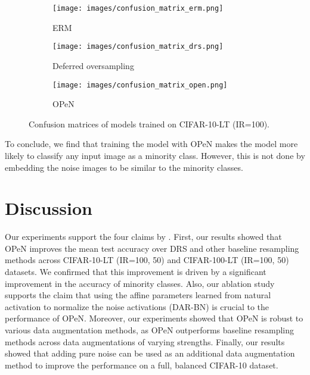 \begin{figure}[!ht]
    \centering
    \begin{subfigure}[b]{0.3\textwidth}
        \centering
        \texttt{[image: images/confusion\_matrix\_erm.png]}
        \caption{ERM}
        \label{fig:cmatrix_erm}
    \end{subfigure}
    \hfill
    \begin{subfigure}[b]{0.3\textwidth}
        \centering
        \texttt{[image: images/confusion\_matrix\_drs.png]}
        \caption{Deferred oversampling}
        \label{fig:cmatrix_drs}
    \end{subfigure}
    \hfill
    \begin{subfigure}[b]{0.3\textwidth}
        \centering
        \texttt{[image: images/confusion\_matrix\_open.png]}
        \caption{OPeN}
        \label{fig:cmatrix_open}
    \end{subfigure}
    \caption{Confusion matrices of models trained on CIFAR-10-LT (IR=100).}
    \label{fig:confusion_matrices}
\end{figure}

To conclude, we find that training the model with OPeN makes the model more likely to classify any input image as a minority class. However, this is not done by embedding the noise images to be similar to the minority classes.





\section{Discussion}
Our experiments support the four claims by \citet{PureNoise}. First, our results showed that OPeN improves the mean test accuracy over DRS and other baseline resampling methods across CIFAR-10-LT (IR=100, 50) and CIFAR-100-LT (IR=100, 50) datasets. We confirmed that this improvement is driven by a significant improvement in the accuracy of minority classes. Also, our ablation study supports the claim that using the affine parameters learned from natural activation to normalize the noise activations (DAR-BN) is crucial to the performance of OPeN. Moreover, our experiments showed that OPeN is robust to various data augmentation methods, as OPeN outperforms baseline resampling methods across data augmentations of varying strengths. Finally, our results showed that adding pure noise can be used as an additional data augmentation method to improve the performance on a full, balanced CIFAR-10 dataset.

